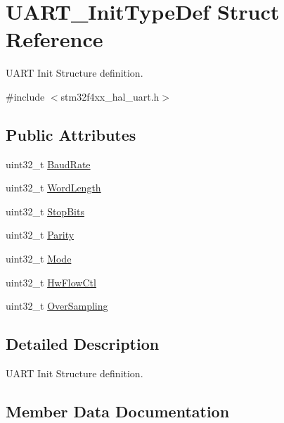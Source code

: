 \hypertarget{struct_u_a_r_t___init_type_def}{}\section{U\+A\+R\+T\+\_\+\+Init\+Type\+Def Struct Reference}
\label{struct_u_a_r_t___init_type_def}


U\+A\+RT Init Structure definition.  




{\ttfamily \#include $<$stm32f4xx\+\_\+hal\+\_\+uart.\+h$>$}

\subsection*{Public Attributes}
\begin{DoxyCompactItemize}
\item 
uint32\+\_\+t \hyperlink{struct_u_a_r_t___init_type_def_ae460c2e4d7ddc67bca9f5756f45b1d83}{Baud\+Rate}
\item 
uint32\+\_\+t \hyperlink{struct_u_a_r_t___init_type_def_a0f1cd85e62aa4fd4b36ee9e610e7789f}{Word\+Length}
\item 
uint32\+\_\+t \hyperlink{struct_u_a_r_t___init_type_def_a6717dfe595617c7b2d57139d9cd306ef}{Stop\+Bits}
\item 
uint32\+\_\+t \hyperlink{struct_u_a_r_t___init_type_def_adc92243425cb18cb8b5f03692841db48}{Parity}
\item 
uint32\+\_\+t \hyperlink{struct_u_a_r_t___init_type_def_ab2ee6ea5a5d4ca5ee6b759be197bcfcb}{Mode}
\item 
uint32\+\_\+t \hyperlink{struct_u_a_r_t___init_type_def_adbf4734130666b94201c6658464c1622}{Hw\+Flow\+Ctl}
\item 
uint32\+\_\+t \hyperlink{struct_u_a_r_t___init_type_def_a77c2c86a2186e09cbf022e27c0c82324}{Over\+Sampling}
\end{DoxyCompactItemize}


\subsection{Detailed Description}
U\+A\+RT Init Structure definition. 

\subsection{Member Data Documentation}
